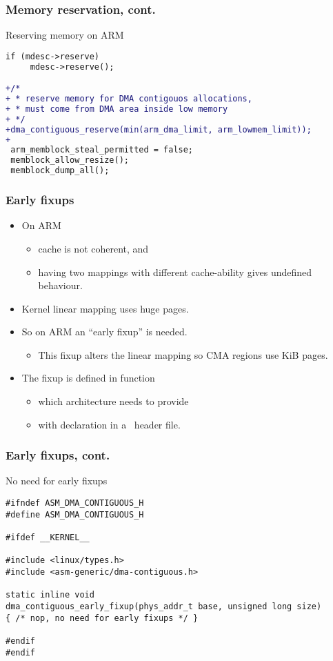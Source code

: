 \begin{frame}[fragile]
  \frametitle{Memory reservation, cont.}

  \begin{block}{Reserving memory on ARM}
\begin{lstlisting}[language=diff]
 if (mdesc->reserve)
     mdesc->reserve();

+/*
+ * reserve memory for DMA contigouos allocations,
+ * must come from DMA area inside low memory
+ */
+dma_contiguous_reserve(min(arm_dma_limit, arm_lowmem_limit));
+
 arm_memblock_steal_permitted = false;
 memblock_allow_resize();
 memblock_dump_all();
\end{lstlisting}
  \end{block}
\end{frame}

\begin{frame}
  \frametitle{Early fixups}

  \begin{itemize}
  \item On ARM
    \begin{itemize}
    \item cache is not coherent, and
    \item having two mappings with different cache-ability gives
      undefined behaviour.
    \end{itemize}
  \item Kernel linear mapping uses huge pages.
  \item So on ARM an “early fixup” is needed.
    \begin{itemize}
    \item This fixup alters the linear mapping so CMA regions use
      \unit[4]{KiB} pages.
    \end{itemize}
  \item The fixup is defined in
     function
    \begin{itemize}
    \item which architecture needs to provide
    \item with declaration in a~ header file.
    \end{itemize}
  \end{itemize}
\end{frame}

\begin{frame}[fragile]
  \frametitle{Early fixups, cont.}

  \begin{block}{No need for early fixups}
\begin{lstlisting}
#ifndef ASM_DMA_CONTIGUOUS_H
#define ASM_DMA_CONTIGUOUS_H

#ifdef __KERNEL__

#include <linux/types.h>
#include <asm-generic/dma-contiguous.h>

static inline void
dma_contiguous_early_fixup(phys_addr_t base, unsigned long size)
{ /* nop, no need for early fixups */ }

#endif
#endif
\end{lstlisting}
  \end{block}
\end{frame}

